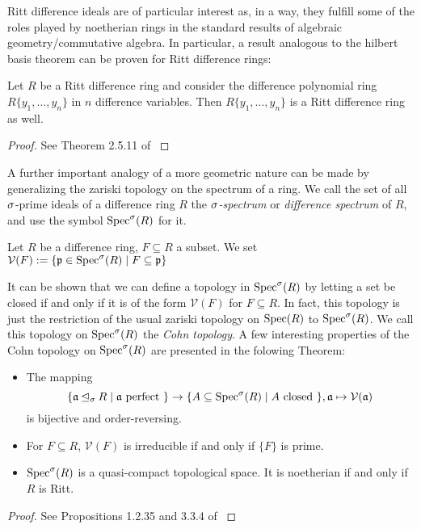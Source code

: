 Ritt difference ideals are of particular interest as, in a way, they fulfill some of the roles played by noetherian rings in the standard results of algebraic geometry/commutative algebra.
In particular, a result analogous to the hilbert basis theorem can be proven for Ritt difference rings:

\begin{theorem}
Let $R$ be a Ritt difference ring and consider the difference polynomial ring $R\{y_1, \ldots, y_n\}$ in $n$ difference variables. Then $R\{y_1, \ldots, y_n\}$ is a Ritt difference ring as well.
\begin{proof} See Theorem 2.5.11 of \cite{levin} \end{proof}
\end{theorem}

A further important analogy of a more geometric nature can be made by generalizing the zariski topology on the spectrum of a ring. 
We call the set of all $\sigma$-prime ideals of a difference ring $R$ the \emph{$\sigma$-spectrum} or \emph{difference spectrum}  of $R$, and use the symbol $\operatorname{Spec}^\sigma(R)$ for it.

\begin{defn}
Let $R$ be a difference ring, $F \subseteq R$ a subset. We set $\mathcal{V}(F) := \{ \mathfrak{p} \in \operatorname{Spec}^\sigma(R) \mid F \subseteq \mathfrak{p} \}$
\end{defn}

It can be shown that we can define a topology in $\operatorname{Spec}^\sigma(R)$ by letting a set be closed if and only if it is of the form $\mathcal{V}(F)$ for $F \subseteq R$. 
In fact, this topology is just the restriction of the usual zariski topology on $\operatorname{Spec}(R)$ to $\operatorname{Spec}^\sigma(R)$.
We call this topology on $\operatorname{Spec}^\sigma(R)$ the \emph{Cohn topology}. A few interesting properties of the Cohn topology on $\operatorname{Spec}^\sigma(R)$ are presented in the folowing Theorem:

\begin{prop}
\begin{itemize}
Let $R$ be a difference ring. Then: 
\item The mapping $$\{ \mathfrak{a} \unlhd_{\sigma} R \mid \mathfrak{a}\text{ perfect }\} \rightarrow \{ A \subseteq \operatorname{Spec}^\sigma(R) \mid A \text{ closed }\}, \mathfrak{a} \mapsto \mathcal{V}(\mathfrak{a})$$
 is bijective and order-reversing.
\item For $F \subseteq R$,  $\mathcal{V}(F)$ is irreducible if and only if $\{F\}$ is prime.
\item $\operatorname{Spec}^\sigma(R)$ is a quasi-compact topological space. It is noetherian if and only if $R$ is Ritt.
\end{itemize}
\begin{proof} See Propositions 1.2.35 and 3.3.4 of \cite{wibmer} \end{proof}
\end{prop}


